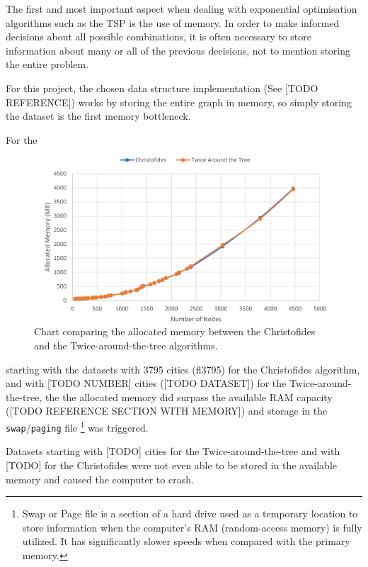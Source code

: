 \documentclass[12pt]{article}
\begin{document}

The first and most important aspect when dealing with exponential optimisation algorithms such as 
the TSP is the use of memory. In order to make informed decisions about all possible combinations, 
it is often necessary to store information about many or all of the previous decisions, not to 
mention storing the entire problem.

For this project, the chosen data structure implementation (See [TODO REFERENCE]) works by storing 
the entire graph in memory, so simply storing the dataset is the first memory bottleneck.

For the 

\begin{figure}[ht]
\centering
\includegraphics[height=.325\textheight]{memory_use_comparison.png}
\caption{Chart comparing the allocated memory between the Christofides and the Twice-around-the-tree algorithms.}
\label{fig:mem_use}
\end{figure}

starting with the datasets with 3795 cities (fl3795) for the Christofides algorithm, 
and with [TODO NUMBER] cities ([TODO DATASET]) for the Twice-around-the-tree, the the allocated memory did surpass 
the available RAM capacity ([TODO REFERENCE SECTION WITH MEMORY]) and storage in the \texttt{swap}/\texttt{paging} 
file 
\footnote{Swap or Page file is a section of a hard drive used as a temporary location to store information 
when the computer's RAM (random-access memory) is fully utilized. It has significantly slower speeds when 
compared with the primary memory.} 
was triggered.

Datasets starting with [TODO] cities for the Twice-around-the-tree and with [TODO] for the Christofides were 
not even able to be stored in the available memory and caused the computer to crash.
\end{document}
